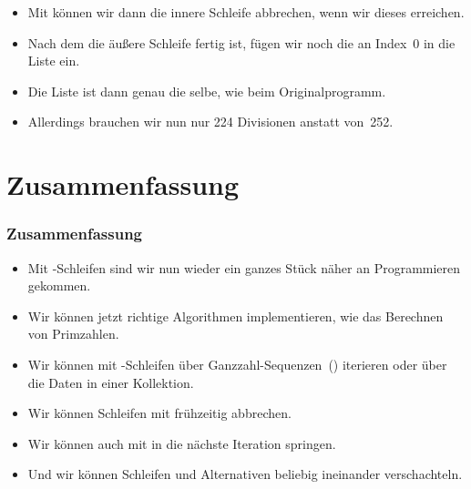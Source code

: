 \documentclass[aspectratio=169,mathserif,notheorems]{beamer}%
\begin{document}
\begin{frame}[t]
{{\begin{itemize}
{}%
%
%
%
%
%
\item<20-> Mit  können wir dann die innere Schleife abbrechen, wenn wir dieses  erreichen.%
%
\item<21-> Nach dem die äußere Schleife fertig ist, fügen wir noch die  an Index~0 in die Liste ein.%
%
\item<22-> Die Liste ist dann genau die selbe, wie beim Originalprogramm.%
%
\item<23-> Allerdings brauchen wir nun nur 224 Divisionen anstatt von~252.
\end{itemize}%
}}%
%
%
%
%
%
\end{frame}%
%
\section{Zusammenfassung}%
%
\begin{frame}%
\frametitle{Zusammenfassung}%
\begin{itemize}%
\item Mit -Schleifen sind wir nun wieder ein ganzes Stück näher an  Programmieren gekommen.%
%
\item<2-> Wir können jetzt richtige Algorithmen implementieren, wie das Berechnen von Primzahlen.%
%
\item<3-> Wir können mit -Schleifen über Ganzzahl-Sequenzen~() iterieren oder über die Daten in einer Kollektion.%
%
\item<4-> Wir können Schleifen mit  frühzeitig abbrechen.%
%
\item<5-> Wir können auch mit  in die nächste Iteration springen.%
%
\item<6-> Und wir können Schleifen und Alternativen beliebig ineinander verschachteln.%
\end{itemize}%
\end{frame}%
%
\endPresentation%
\end{document}
